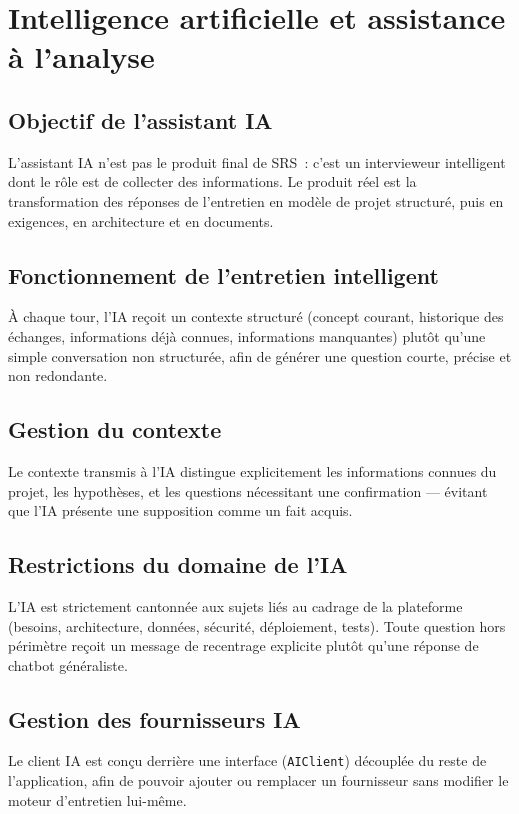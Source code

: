 \chapter{Intelligence artificielle et assistance à l'analyse}

\section{Objectif de l'assistant IA}
L'assistant IA n'est pas le produit final de SRS~: c'est un intervieweur intelligent
dont le rôle est de collecter des informations. Le produit réel est la transformation
des réponses de l'entretien en modèle de projet structuré, puis en exigences, en
architecture et en documents.

\section{Fonctionnement de l'entretien intelligent}
À chaque tour, l'IA reçoit un contexte structuré (concept courant, historique des
échanges, informations déjà connues, informations manquantes) plutôt qu'une simple
conversation non structurée, afin de générer une question courte, précise et non
redondante.

\section{Gestion du contexte}
Le contexte transmis à l'IA distingue explicitement les informations connues du projet,
les hypothèses, et les questions nécessitant une confirmation — évitant que l'IA
présente une supposition comme un fait acquis.

\section{Restrictions du domaine de l'IA}
L'IA est strictement cantonnée aux sujets liés au cadrage de la plateforme (besoins,
architecture, données, sécurité, déploiement, tests). Toute question hors périmètre
reçoit un message de recentrage explicite plutôt qu'une réponse de chatbot généraliste.

\section{Gestion des fournisseurs IA}
Le client IA est conçu derrière une interface (\texttt{AIClient}) découplée du reste de
l'application, afin de pouvoir ajouter ou remplacer un fournisseur sans modifier le
moteur d'entretien lui-même.

